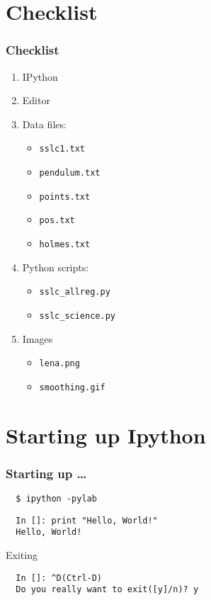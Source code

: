 \documentclass[14pt,compress]{beamer}
\newcommand{\typ}[1]{\lstinline{#1}}
\begin{document}
\section{Checklist}
\begin{frame}
\frametitle{Checklist}
  \begin{enumerate}
    \item IPython
    \item Editor
    \item Data files: 
      \begin{itemize}
      \item \typ{sslc1.txt}
      \item \typ{pendulum.txt}
      \item \typ{points.txt}
      \item \typ{pos.txt}
      \item \typ{holmes.txt}
      \end{itemize}
    \item Python scripts: 
      \begin{itemize}
      \item \typ{sslc_allreg.py}
      \item \typ{sslc_science.py}
      \end{itemize}
    \item Images
      \begin{itemize}
      \item \typ{lena.png}
      \item \typ{smoothing.gif}
      \end{itemize}
  \end{enumerate}
\end{frame}

\section{Starting up Ipython}
\begin{frame}[fragile]
\frametitle{Starting up \ldots}
\begin{block}{}
\begin{lstlisting}
  $ ipython -pylab  
\end{lstlisting} %
\end{block}
\begin{lstlisting}     
  In []: print "Hello, World!"
  Hello, World!
\end{lstlisting}
Exiting
\begin{lstlisting}
  In []: ^D(Ctrl-D)
  Do you really want to exit([y]/n)? y
\end{lstlisting}
\end{frame}
\end{document}

